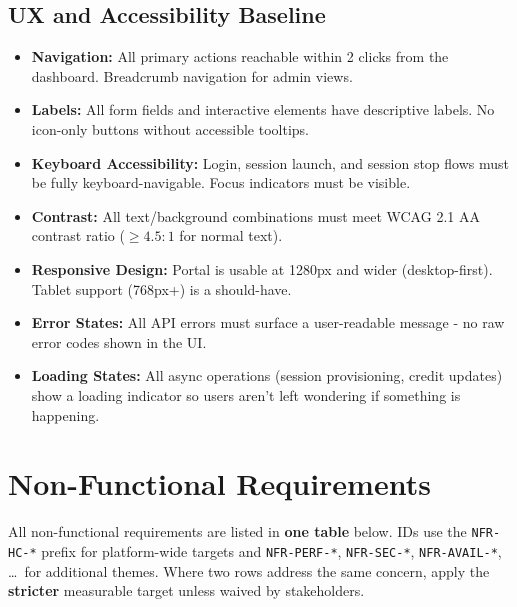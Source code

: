 \documentclass[12pt,a4paper]{article}
\begin{document}
\subsection{UX and Accessibility Baseline}

\begin{itemize}[leftmargin=1.5em]
  \item \textbf{Navigation:} All primary actions reachable within 2 clicks from the dashboard. Breadcrumb navigation for admin views.
  \item \textbf{Labels:} All form fields and interactive elements have descriptive labels. No icon-only buttons without accessible tooltips.
  \item \textbf{Keyboard Accessibility:} Login, session launch, and session stop flows must be fully keyboard-navigable. Focus indicators must be visible.
  \item \textbf{Contrast:} All text/background combinations must meet WCAG 2.1 AA contrast ratio ($\geq 4.5:1$ for normal text).
  \item \textbf{Responsive Design:} Portal is usable at 1280px and wider (desktop-first). Tablet support (768px+) is a should-have.
  \item \textbf{Error States:} All API errors must surface a user-readable message - no raw error codes shown in the UI.
  \item \textbf{Loading States:} All async operations (session provisioning, credit updates) show a loading indicator so users aren't left wondering if something is happening.
\end{itemize}

\newpage
\section{Non-Functional Requirements}

\noindent All non-functional requirements are listed in \textbf{one table} below. IDs use the \texttt{NFR-HC-*} prefix for platform-wide targets and \texttt{NFR-PERF-*}, \texttt{NFR-SEC-*}, \texttt{NFR-AVAIL-*}, \ldots\ for additional themes. Where two rows address the same concern, apply the \textbf{stricter} measurable target unless waived by stakeholders.
\end{document}
